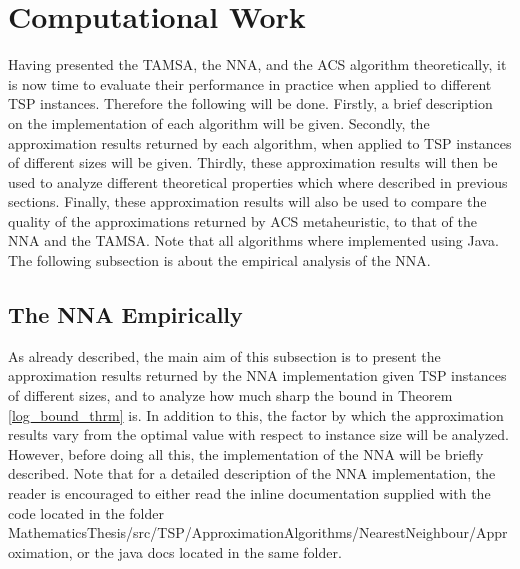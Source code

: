 \documentclass{article}
\begin{document}
\section{Computational Work}
Having presented the TAMSA, the NNA, and the ACS algorithm theoretically, it is now time to evaluate their performance in practice when applied to different TSP instances. Therefore the following will be done. Firstly, a brief description on the implementation of each algorithm will be given. Secondly, the approximation results returned by each algorithm, when applied to TSP instances of different sizes will be given. Thirdly, these approximation results will then be used to analyze different theoretical properties which where described in previous sections. Finally, these approximation results will also be used to compare the quality of the approximations returned by ACS metaheuristic, to that of the NNA and the TAMSA. Note that all algorithms where implemented using Java. The following subsection is about the empirical analysis of the NNA. 
\subsection{The NNA Empirically}
As already described, the main aim of this subsection is to present the approximation results returned by the NNA implementation given TSP instances of different sizes, and to analyze how much sharp the bound in Theorem \ref{log_bound_thrm} is. In addition to this, the factor by which the approximation results vary from the optimal value with respect to instance size will be analyzed. However, before doing all this, the implementation of the NNA will be briefly described. Note that for a detailed description of the NNA implementation, the reader is encouraged to either read the inline documentation supplied with the code located in the folder MathematicsThesis/src/TSP/ApproximationAlgorithms/NearestNeighbour/Approximation, or the java docs located in the same folder.
\end{document}
